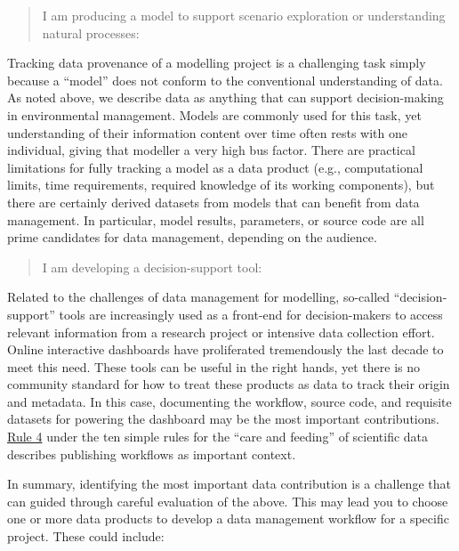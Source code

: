 \documentclass[
]{book}
\begin{document}
\begin{quote}
I am producing a model to support scenario exploration or understanding natural processes:
\end{quote}

Tracking data provenance of a modelling project is a challenging task simply because a ``model'' does not conform to the conventional understanding of data. As noted above, we describe data as anything that can support decision-making in environmental management. Models are commonly used for this task, yet understanding of their information content over time often rests with one individual, giving that modeller a very high bus factor. There are practical limitations for fully tracking a model as a data product (e.g., computational limits, time requirements, required knowledge of its working components), but there are certainly derived datasets from models that can benefit from data management. In particular, model results, parameters, or source code are all prime candidates for data management, depending on the audience.

\begin{quote}
I am developing a decision-support tool:
\end{quote}

Related to the challenges of data management for modelling, so-called ``decision-support'' tools are increasingly used as a front-end for decision-makers to access relevant information from a research project or intensive data collection effort. Online interactive dashboards have proliferated tremendously the last decade to meet this need. These tools can be useful in the right hands, yet there is no community standard for how to treat these products as data to track their origin and metadata. In this case, documenting the workflow, source code, and requisite datasets for powering the dashboard may be the most important contributions. \href{https://journals.plos.org/ploscompbiol/article?id=10.1371/journal.pcbi.1003542\#s4}{Rule 4} under the ten simple rules for the ``care and feeding'' of scientific data \citep{Goodman14} describes publishing workflows as important context.

In summary, identifying the most important data contribution is a challenge that can guided through careful evaluation of the above. This may lead you to choose one or more data products to develop a data management workflow for a specific project. These could include:
\end{document}
